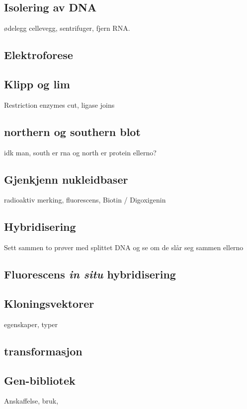\subsection{Isolering av DNA}
    ødelegg cellevegg, sentrifuger, fjern RNA.

\subsection{Elektroforese}

\subsection{Klipp og lim}
    Restriction enzymes cut, ligase joins

\subsection{northern og southern blot}
    idk man, south er rna og north er protein ellerno?
\subsection{Gjenkjenn nukleidbaser}
    radioaktiv merking, fluorescens, Biotin / Digoxigenin

\subsection{Hybridisering}
    Sett sammen to prøver med splittet DNA og se om de slår seg sammen ellerno

\subsection{Fluorescens \textit{in situ} hybridisering}

\subsection{Kloningsvektorer}
    egenskaper, typer

\subsection{transformasjon}

\subsection{Gen-bibliotek}
    Anskaffelse, bruk, 

